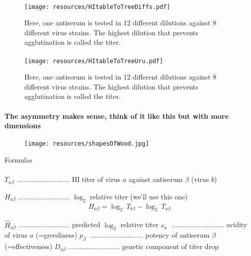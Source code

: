\documentclass{beamer}
\begin{document}
\begin{darkframes}
    \begin{frame}{\subsecname}
      \framesubtitle{}
      \begin{figure}
        \texttt{[image: resources/HItableToTreeDiffs.pdf]}
        \caption{\footnotesize Here, one antiserum is tested in 12 different dilutions against 8 different virus strains. The highest dilution that prevents agglutination is called the titer.}
      \end{figure}
    \end{frame}

    \begin{frame}{\subsecname}
      \framesubtitle{}
      \begin{figure}
        \texttt{[image: resources/HItableToTreeUru.pdf]}
        \caption{\footnotesize Here, one antiserum is tested in 12 different dilutions against 8 different virus strains. The highest dilution that prevents agglutination is called the titer.}
      \end{figure}
    \end{frame}

    \begin{frame}{\subsecname}
      \framesubtitle{\small The asymmetry makes sense, think of it like this but with more dmensions}
      \begin{figure}
        \texttt{[image: resources/shapesOfWood.jpg]}
        \caption{\footnotesize \cite{rosipaw10}}
      \end{figure}
    \end{frame}

    \begin{frame}[allowframebreaks]{Formulas}
      \framesubtitle{}
      $T_{a\beta}~\ $........................... HI titer of virus $a$ against antiserum $\beta$ (virus $b$)

      $H_{a\beta}~$........................... $\log_2$ relative titer (we'll use this one)
      \begin{align}
        H_{a\beta} = \log_2 ~ T_{b\beta} - \log_2 ~ T_{a\beta}
      \end{align}

      $\hat{H}_{a\beta}~$........................... predicted $\log_2$ relative titer
      $v_{a}~~~$........................... avidity of virus $a$ (=greediness)
      $p_{\beta}~~~$........................... potency of antiserum $\beta$ (=effectiveness)
      $D_{a\beta}~$........................... genetic component of titer drop


\end{frame}
\end{darkframes}
\end{document}
